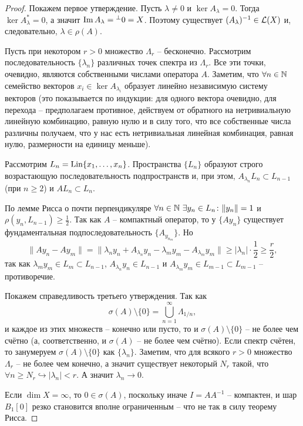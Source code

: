 \begin{proof}
    Покажем первое утверждение.
    Пусть $\lambda \neq 0$ и $\ker A_\lambda = 0$.
    Тогда $\ker A_\lambda^* = 0$, а значит $\operatorname{Im} A_\lambda = {}^\perp 0 = X$.
    Поэтому существует $(A_\lambda)^{-1} \in \mathcal{L}(X)$ и, следовательно, $\lambda \in \rho(A)$.

    Пусть при некотором $r > 0$ множество $\Lambda_r$ -- бесконечно.
    Рассмотрим последовательность $\{\lambda_n\}$ различных точек спектра из $\Lambda_r$.
    Все эти точки, очевидно, являются собственными числами оператора $A$.
    Заметим, что $\forall n \in \mathbb{N}$ семейство векторов $x_i \in \ker A_{\lambda_i}$ образует линейно независимую систему векторов (это показывается по индукции: для одного вектора очевидно, для перехода -- предполагаем противное, действуем от обратного на нетривиальную линейную комбинацию, равную нулю и в силу того, что все собственные числа различны получаем, что у нас есть нетривиальная линейная комбинация, равная нулю, размерности на единицу меньше).

    Рассмотрим $L_n = \operatorname{Lin}\{x_1, \ldots, x_n\}$.
    Пространства $\{L_n\}$ образуют строго возрастающую последовательность подпространств и, при этом, $A_{\lambda_n} L_n \subset L_{n - 1}$ (при $n \geq 2$) и $AL_n \subset L_n$.

    По лемме Рисса о почти перпендикуляре $\forall n \in \mathbb{N} \ \exists y_n \in L_n\colon \|y_n\| = 1$ и $\rho(y_n, L_{n - 1}) \geq \frac{1}{2}$.
    Так как $A$ -- компактный оператор, то у $\{Ay_n\}$ существует фундаментальная подпоследовательность $\{A_{y_{n_m}}\}$.
    Но
    \[
        \|A y_n - A y_m\| = \|\lambda_n y_n + A_{\lambda_n} y_n - \lambda_m y_m - A_{\lambda_m} y_m\| \geq |\lambda_n|\cdot \frac{1}{2} \geq \frac{r}{2},
    \]
    так как $\lambda_m y_m \in L_{m} \subset L_{n - 1}$, $A_{\lambda_n} y_n \in L_{n - 1}$ и $A_{\lambda_m} y_m \in L_{m - 1} \subset L_{m - 1}$ -- противоречие.

    Покажем справедливость третьего утверждения.
    Так как
    \[
        \sigma(A) \setminus \{0\} = \bigcup_{n = 1}^{\infty} \Lambda_{1/n},
    \]  
    и каждое из этих множеств -- конечно или пусто, то и $\sigma(A) \setminus \{0\}$ -- не более чем счётно (а, соответственно, и $\sigma(A)$ -- не более чем счётно).
    Если спектр счётен, то занумеруем $\sigma(A) \setminus \{0\}$ как $\{\lambda_n\}$.
    Заметим, что для всякого $r > 0$ множество $\Lambda_r$ -- не более чем конечно, а значит существует некоторый $N_r$ такой, что $\forall n \geq N_r \hookrightarrow |\lambda_n| < r$.
    А значит $\lambda_n \rightarrow 0$.

    Если $\dim X = \infty$, то $0 \in \sigma(A)$, поскольку иначе $I = AA^{-1}$ -- компактен, и шар $B_1[0]$ резко становится вполне ограниченным -- что не так в силу теорему Рисса.
\end{proof}
